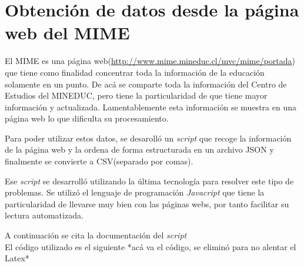 \chapter{Obtención de datos desde la página web del MIME}
\label{ap:obtencionmime}
El MIME es una página web(\url{http://www.mime.mineduc.cl/mvc/mime/portada}) que tiene como finalidad concentrar toda la información de la educación solamente en un punto. De acá se comparte toda la información del Centro de Estudios del MINEDUC, pero tiene la particularidad de que tiene mayor información y actualizada. Lamentablemente esta información se muestra en una página web lo que dificulta su procesamiento.

Para poder utilizar estos datos, se desarolló un \textit{script} que recoge la información de la página web y la ordena de forma estructurada en un archivo JSON y finalmente se convierte a CSV(separado por comas).

Ese \textit{script} se desarrolló utilizando la última tecnología para resolver este tipo de problemas. Se utilizó el lenguaje de programación \textit{Javacript} que tiene la particularidad de llevarse muy bien con las páginas webs, por tanto facilitar su lectura automatizada.

A continuación se cita la documentación del \textit{script}\\
\noindent{}
El código utilizado es el siguiente
*acá va el código, se eliminó para no alentar el Latex*


